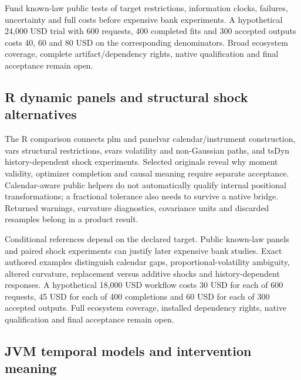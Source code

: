 Fund known-law public tests of target restrictions, information clocks,
failures, uncertainty and full costs before expensive bank experiments.
A hypothetical 24,000 USD trial with 600 requests, 400 completed fits
and 300 accepted outputs costs 40, 60 and 80 USD on the corresponding
denominators. Broad ecosystem coverage, complete artifact/dependency
rights, native qualification and final acceptance remain open.
\citep{exec25_pydyn_choice}

\hypertarget{r-dynamic-panels-and-structural-shock-alternatives}{%
\subsection{R dynamic panels and structural shock
alternatives}\label{r-dynamic-panels-and-structural-shock-alternatives}}

The R comparison connects plm and panelvar calendar/instrument
construction, vars structural restrictions, svars volatility and
non-Gaussian paths, and tsDyn history-dependent shock experiments.
Selected originals reveal why moment validity, optimizer completion and
causal meaning require separate acceptance. Calendar-aware public
helpers do not automatically qualify internal positional
transformations; a fractional tolerance also needs to survive a native
bridge. Returned warnings, curvature diagnostics, covariance units and
discarded resamples belong in a product result.
\citep{exec25_rdyn_plm,exec25_rdyn_panelvar,exec25_rdyn_vars,exec25_rdyn_svars,exec25_rdyn_tsdyn}

Conditional references depend on the declared target. Public known-law
panels and paired shock experiments can justify later expensive bank
studies. Exact authored examples distinguish calendar gaps,
proportional-volatility ambiguity, altered curvature, replacement versus
additive shocks and history-dependent responses. A hypothetical 18,000
USD workflow costs 30 USD for each of 600 requests, 45 USD for each of
400 completions and 60 USD for each of 300 accepted outputs. Full
ecosystem coverage, installed dependency rights, native qualification
and final acceptance remain open. \citep{exec25_rdyn_choice}

\hypertarget{jvm-temporal-models-and-intervention-meaning}{%
\subsection{JVM temporal models and intervention
meaning}\label{jvm-temporal-models-and-intervention-meaning}}

